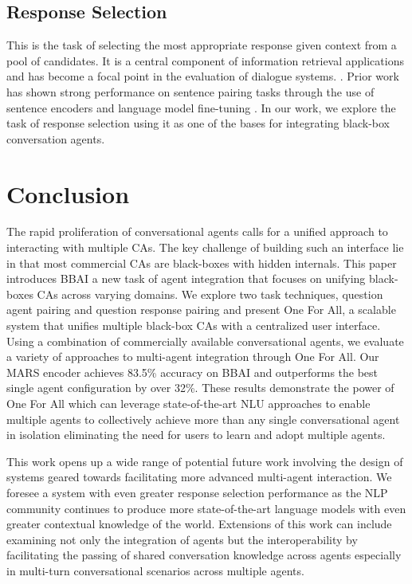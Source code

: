\documentclass[11pt]{article}
\begin{document}
\subsection{Response Selection}
This is the task of selecting the most appropriate response given context from a pool of candidates. It is a central component of information retrieval applications and has become a focal point in the evaluation of dialogue systems. \cite{sato-etal-2020-evaluating, henderson2019convert, DBLP:journals/corr/abs-2010-07785}. Prior work has shown strong performance on sentence pairing tasks through the use of sentence encoders and language model fine-tuning \cite{henderson2019convert, Humeau2020Poly-encoders:, reimers-2019-sentence-bert}. In our work, we explore the task of response selection using it as one of the bases for integrating black-box conversation agents.

\section{Conclusion}
The rapid proliferation of conversational agents calls for a unified approach to interacting with multiple CAs. The key challenge of building such an interface lie in that most commercial CAs are black-boxes with hidden internals. This paper introduces BBAI a new task of agent integration that focuses on unifying black-boxes CAs across varying domains. We explore two task techniques, question agent pairing and question response pairing and present One For All, a scalable system that unifies multiple black-box CAs with a centralized user interface. Using a combination of commercially available conversational agents, we evaluate a variety of approaches to multi-agent integration through One For All.
Our MARS encoder achieves 83.5\% accuracy on BBAI and outperforms the best single agent configuration by over 32\%. These results demonstrate the power of One For All which can leverage state-of-the-art NLU approaches to enable multiple agents to collectively achieve more than any single conversational agent in isolation eliminating the need for users to learn and adopt multiple agents. 

This work opens up a wide range of potential future work involving the design of systems geared towards facilitating more advanced multi-agent interaction. We foresee a system with even greater response selection performance as the NLP community continues to produce more state-of-the-art language models with even greater contextual knowledge of the world. Extensions of this work can include examining not only the integration of agents but the interoperability by facilitating the passing of shared conversation knowledge across agents especially in multi-turn conversational scenarios across multiple agents.
\end{document}
